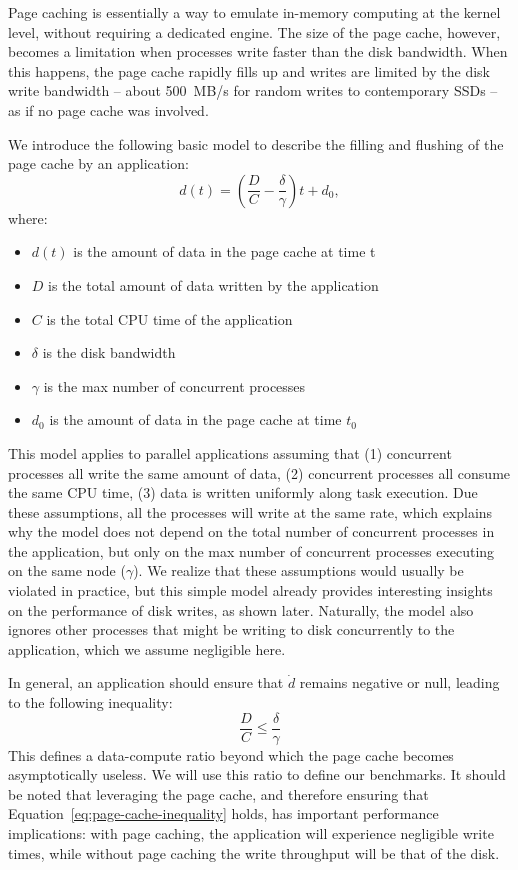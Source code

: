 \documentclass{IEEEtran}
\begin{document}
Page caching is essentially a way to 
emulate in-memory computing at the kernel level, without requiring a 
dedicated engine. The size of the page cache, however, becomes a 
limitation when processes write faster than the disk bandwidth. When 
this happens, the page cache rapidly fills up and writes are limited by 
the disk write bandwidth -- about 500~MB/s for random writes to 
contemporary SSDs  -- as if no page cache was involved.

We introduce the following basic model to describe the filling and 
flushing of the page cache by an application:
$$
d(t) = \left( \frac{D}{C} - \frac{\delta}{\gamma} \right)t + d_0,
$$
where:
\begin{itemize}
\item $d(t)$ is the amount of data in the page cache at time t
\item $D$ is the total amount of data written by the application
\item $C$ is the total CPU time of the application
\item $\delta$ is the disk bandwidth
\item $\gamma$ is the max number of concurrent processes
\item $d_0$ is the amount of data in the page cache at time $t_0$
\end{itemize}

This model applies to parallel applications assuming that (1) 
concurrent processes all write the same amount of data, (2) 
concurrent processes all consume the same CPU time, (3) data is written 
uniformly along task execution. Due these assumptions, all the 
processes will write at the same rate, which explains why the model 
does not depend on the total number of concurrent processes in the 
application, but only on the max number of concurrent processes 
executing on the same node ($\gamma$). We realize that these 
assumptions would usually be violated in practice, but this simple 
model already provides interesting insights on the performance of disk 
writes, as shown later. Naturally, the model also ignores other 
processes that might be writing to disk concurrently to the 
application, which we assume negligible here. 

In general, an application should ensure that $\dot d$ remains negative 
or null, leading to the following inequality:
\begin{equation}
\frac{D}{C} \leq \frac{\delta}{\gamma} \label{eq:page-cache-inequality}
\end{equation}
This defines a data-compute ratio beyond which the page cache becomes 
asymptotically useless. We will use this ratio to define our benchmarks. It 
should be noted that leveraging the page cache, and therefore ensuring 
that Equation~\ref{eq:page-cache-inequality} holds, has important 
performance implications: with page caching, the application will 
experience negligible write times, while without page caching 
the write throughput will be that of the disk.
\end{document}
